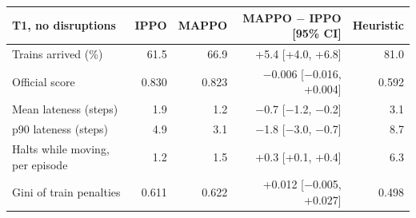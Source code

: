 \begin{tabular}{lrrrr}
\toprule
T1, no disruptions & IPPO & MAPPO & MAPPO $-$ IPPO [95\% CI] & Heuristic \\
\midrule
Trains arrived (\%) & 61.5 & 66.9 & +5.4 [+4.0, +6.8] & 81.0 \\
Official score & 0.830 & 0.823 & $-$0.006 [$-$0.016, +0.004] & 0.592 \\
Mean lateness (steps) & 1.9 & 1.2 & $-$0.7 [$-$1.2, $-$0.2] & 3.1 \\
p90 lateness (steps) & 4.9 & 3.1 & $-$1.8 [$-$3.0, $-$0.7] & 8.7 \\
Halts while moving, per episode & 1.2 & 1.5 & +0.3 [+0.1, +0.4] & 6.3 \\
Gini of train penalties & 0.611 & 0.622 & +0.012 [$-$0.005, +0.027] & 0.498 \\
\bottomrule
\end{tabular}
